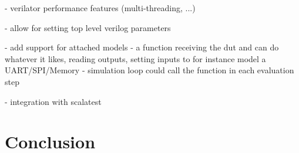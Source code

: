 \documentclass[11pt,a4paper]{report}
\begin{document}
- verilator performance features (multi-threading, ...)

- allow for setting top level verilog parameters

- add support for attached models
- a function receiving the dut and can do whatever it likes, reading outputs, setting inputs to for instance model a
UART/SPI/Memory
- simulation loop could call the function in each evaluation step

- integration with scalatest

\chapter{Conclusion} %

\printbibliography
\end{document}
